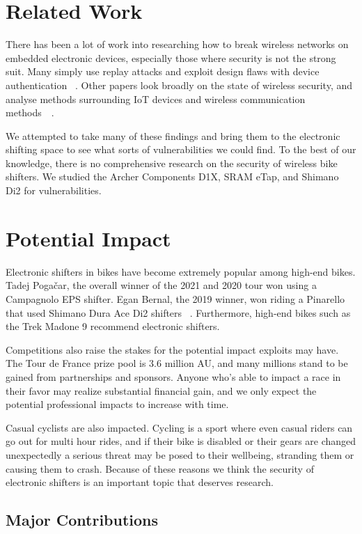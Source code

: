 \documentclass[letterpaper,twocolumn,10pt]{article}
\begin{document}
\section{Related Work}

There has been a lot of work into researching how to break wireless networks on embedded electronic devices, especially those where security is not the strong suit. Many simply use replay attacks and exploit design flaws with device authentication~ \cite{Halperin}. Other papers look broadly on the state of wireless security, and analyse methods surrounding IoT devices and wireless communication methods~\cite{Choi}~\cite{Radek}.

We attempted to take many of these findings and bring them to the electronic shifting space to see what sorts of vulnerabilities we could find. To the best of our knowledge, there is no comprehensive research on the security of wireless bike shifters. We studied the Archer Components D1X, SRAM eTap, and Shimano Di2 for vulnerabilities.

\section{Potential Impact}

Electronic shifters in bikes have become extremely popular among high-end bikes. Tadej Pogačar, the overall winner of the 2021 and 2020 tour won using a Campagnolo EPS shifter. Egan Bernal, the 2019 winner, won riding a Pinarello that used Shimano Dura Ace Di2 shifters~ \cite{GCNTech}. Furthermore, high-end bikes such as the Trek Madone 9 recommend electronic shifters.

Competitions also raise the stakes for the potential impact exploits may have. The Tour de France prize pool is 3.6 million AU, and many millions stand to be gained from partnerships and sponsors. Anyone who's able to impact a race in their favor may realize substantial financial gain, and we only expect the potential professional impacts to increase with time.

Casual cyclists are also impacted. Cycling is a sport where even casual riders can go out for multi hour rides, and if their bike is disabled or their gears are changed unexpectedly a serious threat may be posed to their wellbeing, stranding them or causing them to crash. Because of these reasons we think the security of electronic shifters is an important topic that deserves research.

\subsection{Major Contributions}
\end{document}
